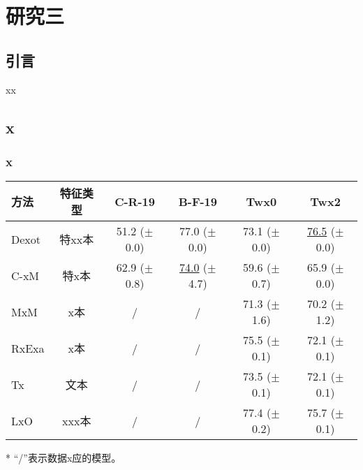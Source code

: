 
\chapter{ 研究三}\label{ch-x}
\section{引言}
xx

\section{x}
\subsection{x}\label{sec-xx x}


\begin{table}[H]\footnotesize%
	\centering
	\begin{threeparttable}[b]

	\label{tbl:adsfaf-detection}
	\begin{tabular}{lccccc}
		\hline
		\rowcolor{gray!15}
		方法 & 特征类型 & C-R-19\cite{conferencekey} & B-F-19\cite{conferencekey} & Twx0\cite{conferencekey} & Twx2\cite{conferencekey} \\
		\hline
		Dexot\cite{conferencekey} & 特xx本  & 51.2 ($\pm$0.0) & 77.0 ($\pm$0.0) & 73.1 ($\pm$0.0) & \underline{76.5} ($\pm$0.0) \\
		C-xM\cite{conferencekey} & 特x本  & 62.9 ($\pm$0.8) & \underline{74.0} ($\pm$4.7) & 59.6 ($\pm$0.7) & 65.9 ($\pm$0.0) \\
		MxM\cite{conferencekey} & x本  & / & / & 71.3 ($\pm$1.6) & 70.2 ($\pm$1.2) \\
		RxExa\cite{conferencekey} & x本  & / & / & 75.5 ($\pm$0.1) & 72.1 ($\pm$0.1) \\
		Tx\cite{conferencekey} & 文本  & / & / & 73.5 ($\pm$0.1) & 72.1 ($\pm$0.1) \\
		LxO\cite{conferencekey} & xxx本  & / & / & 77.4 ($\pm$0.2) & 75.7 ($\pm$0.1) \\
		\hline
	\end{tabular}
	\begin{tablenotes}
		\item[*] ``/''表示数据x应的模型。
	\end{tablenotes}
	\end{threeparttable}
\end{table}


